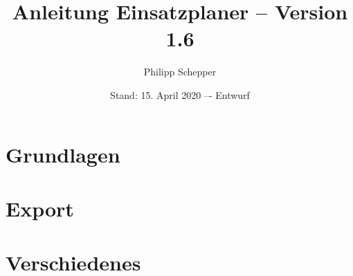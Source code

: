 \documentclass[a4paper,ngerman,oneside]{scrbook}
\title{Anleitung Einsatzplaner -- Version 1.6}
\author{Philipp Schepper}
\date{Stand: 15. April 2020 –- Entwurf}
\begin{document}
\maketitle

\frontmatter
\tableofcontents


\mainmatter
\part{Grundlagen}





\part{Export}


\part{Verschiedenes}



\appendix


\backmatter


\end{document}
